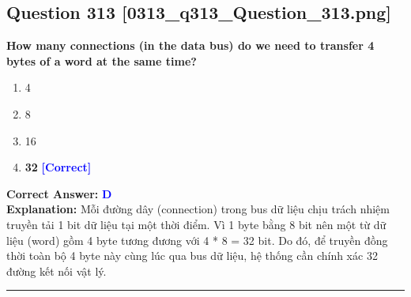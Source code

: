 \documentclass[11pt,a4paper]{article}
\begin{document}
\begin{minipage}{\textwidth}
\subsection*{Question 313 \quad \footnotesize{[0313\_q313\_Question\_313.png]}}
\noindent \textbf{How many connections (in the data bus) do we need to transfer 4 bytes of a word at the same time?}

\begin{enumerate}[label=\Alph*.]
    \item 4
    \item 8
    \item 16
    \item \textbf{32} \hfill \textcolor{blue}{\textbf{[Correct]}}
\end{enumerate}

\noindent \textbf{Correct Answer:} \textcolor{blue}{\textbf{D}} \\[2pt]
\noindent \textbf{Explanation:} Mỗi đường dây (connection) trong bus dữ liệu chịu trách nhiệm truyền tải 1 bit dữ liệu tại một thời điểm. Vì 1 byte bằng 8 bit nên một từ dữ liệu (word) gồm 4 byte tương đương với 4 * 8 = 32 bit. Do đó, để truyền đồng thời toàn bộ 4 byte này cùng lúc qua bus dữ liệu, hệ thống cần chính xác 32 đường kết nối vật lý.

\par\vspace{0.3cm}
\hrule
\vspace{0.3cm}
\end{minipage}
\end{document}
